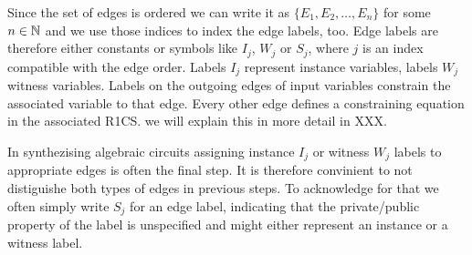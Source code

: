 Since the set of edges is ordered we can write it as $\{E_1,E_2,\ldots, E_n\}$ for some $n\in \mathbb{N}$ and we use those indices to index the edge labels, too. Edge labels are therefore either constants or symbols like $I_j$, $W_j$ or $S_j$, where $j$ is an index compatible with the edge order. Labels $I_j$ represent instance variables, labels $W_j$ witness variables. Labels on the outgoing edges of input variables constrain the associated variable to that edge. Every other edge defines a constraining equation in the associated R1CS. we will explain this in more detail in XXX.
\begin{notation}
In synthezising algebraic circuits assigning instance $I_j$ or witness $W_j$ labels to appropriate edges is often the final step. It is therefore convinient to not distiguishe both types of edges in previous steps. To acknowledge for that we often simply write $S_j$ for an edge label, indicating that the private/public property of the label is unspecified and might either represent an instance or a witness label. 
\end{notation}
